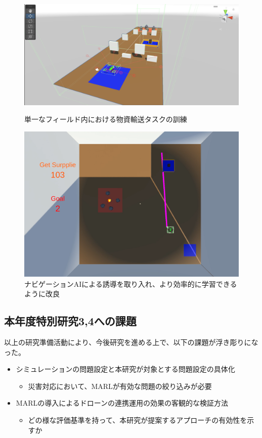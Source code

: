 \documentclass{article}[jsarticle]
\begin{document}
\begin{figure}[H]
    \centering
    \begin{minipage}{0.45\textwidth}
      \centering
      \includegraphics[width=\textwidth]{./Images/202402032208.png} 
      \caption{単一なフィールド内における物資輸送タスクの訓練}
      \label{fig:image1}
    \end{minipage}
    \hfill 
    \begin{minipage}{0.45\textwidth}
      \centering
      \includegraphics[width=\textwidth]{./Images/20240203221239.png}
      \caption{ナビゲーションAIによる誘導を取り入れ、より効率的に学習できるように改良}
      \label{fig:image2}
    \end{minipage}
  \end{figure}
\subsection{本年度特別研究3,4への課題}
以上の研究準備活動により、今後研究を進める上で、以下の課題が浮き彫りになった。
\begin{itemize}
    \item シミュレーションの問題設定と本研究が対象とする問題設定の具体化
    \begin{itemize}
        \item 災害対応において、MARLが有効な問題の絞り込みが必要
    \end{itemize}
    \item MARLの導入によるドローンの連携運用の効果の客観的な検証方法
    \begin{itemize}
        \item どの様な評価基準を持って、本研究が提案するアプローチの有効性を示すか
    \end{itemize}
\end{itemize}
\end{document}
